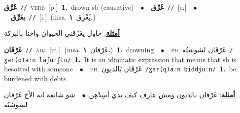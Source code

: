 \documentclass[10pt,a4paper,twoside]{article} %
\begin{document}
\begin{multicols}{2}
{\setlength\topsep{0pt}\textbf{\foreignlanguage{arabic}{غَرَّق}}\ {\color{gray}\texttt{//}\color{black}}\ \textsc{verb}\ [p.]\ \textbf{1.}~drown sb (causative)\ \ $\bullet$\ \ \setlength\topsep{0pt}\textbf{\foreignlanguage{arabic}{غَرِّق}}\ {\color{gray}\texttt{//}\color{black}}\ [c.]\ \ $\bullet$\ \ \setlength\topsep{0pt}\textbf{\foreignlanguage{arabic}{يغَرِّق}}\ {\color{gray}\texttt{//}\color{black}}\ [i.]\ \color{gray}(msa. \foreignlanguage{arabic}{يُغْرِق}~\foreignlanguage{arabic}{\textbf{١.}})\color{black}\  \begin{flushright}\color{gray}\foreignlanguage{arabic}{\textbf{\underline{\foreignlanguage{arabic}{أمثلة}}}: حاول يغَرِّقني الحيوان واحنا بالبركة}\end{flushright}\color{black}} \vspace{2mm}

{\setlength\topsep{0pt}\textbf{\foreignlanguage{arabic}{غَرْقَان}}\ {\color{gray}\texttt{//}\color{black}}\ \textsc{adj}\ [m.]\ \color{gray}(msa. \foreignlanguage{arabic}{غَرْقان}~\foreignlanguage{arabic}{\textbf{١.}})\color{black}\ \textbf{1.}~drowning\ \ $\bullet$\ \ \textsc{ph.} \color{gray} \foreignlanguage{arabic}{غَرْقَان لشوشتُه}\color{black}\ {\color{gray}\texttt{/{\sffamily ɣar(q)aːn laʃuːʃto}/}\color{black}}\ \textbf{1.}~It is an idiomatic expression that means that sb is besotted with someone\ \ $\bullet$\ \ \textsc{ph.} \color{gray} \foreignlanguage{arabic}{غَرْقَان بَالديون}\color{black}\ {\color{gray}\texttt{/{\sffamily ɣar(q)aːn biddjuːn}/}\color{black}}\ \textbf{1.}~be burdened with debts\  \begin{flushright}\color{gray}\foreignlanguage{arabic}{\textbf{\underline{\foreignlanguage{arabic}{أمثلة}}}: غَرْقان بالديون ومش عارف كيف بدي أسِدْهِن\ $\bullet$\ \  شو شايفة انه الأخ غَرْقان لشوشتُه}\end{flushright}\color{black}} \vspace{2mm}


\end{multicols}
\end{document}
